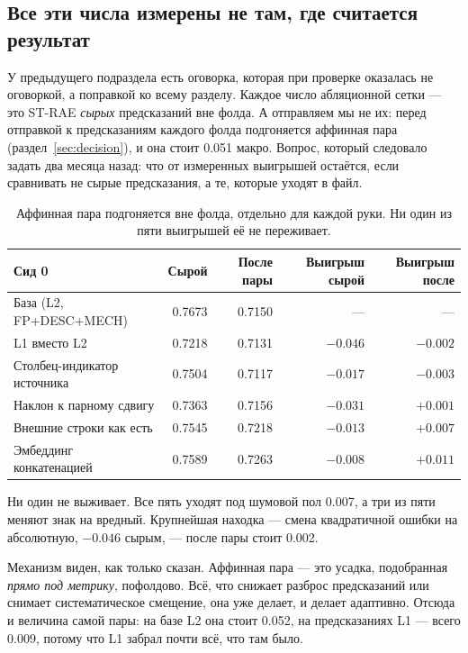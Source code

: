 \subsection{Все эти числа измерены не там, где считается результат}
\label{sec:rawvspost}

У предыдущего подраздела есть оговорка, которая при проверке оказалась не оговоркой, а
поправкой ко всему разделу. Каждое число абляционной сетки --- это ST-RAE \emph{сырых}
предсказаний вне фолда. А отправляем мы не их: перед отправкой к предсказаниям каждого фолда
подгоняется аффинная пара (раздел~\ref{sec:decision}), и она стоит 0.051 макро. Вопрос,
который следовало задать два месяца назад: что от измеренных выигрышей остаётся, если
сравнивать не сырые предсказания, а те, которые уходят в файл.

\begin{table}[htbp]\centering\small
\begin{tabularx}{\textwidth}{@{}Xrrrr@{}}
\toprule
Сид 0 & Сырой & После пары & Выигрыш сырой & \textbf{Выигрыш после} \\
\midrule
База (L2, FP+DESC+MECH)      & 0.7673 & 0.7150 & --- & --- \\
L1 вместо L2                 & 0.7218 & 0.7131 & $-0.046$ & $\mathbf{-0.002}$ \\
Столбец-индикатор источника  & 0.7504 & 0.7117 & $-0.017$ & $\mathbf{-0.003}$ \\
Наклон к парному сдвигу      & 0.7363 & 0.7156 & $-0.031$ & $\mathbf{+0.001}$ \\
Внешние строки как есть      & 0.7545 & 0.7218 & $-0.013$ & $\mathbf{+0.007}$ \\
Эмбеддинг конкатенацией      & 0.7589 & 0.7263 & $-0.008$ & $\mathbf{+0.011}$ \\
\bottomrule
\end{tabularx}
\caption{Аффинная пара подгоняется вне фолда, отдельно для каждой руки. Ни один из пяти
выигрышей её не переживает.}
\label{tab:rawpost}
\end{table}

Ни один не выживает. Все пять уходят под шумовой пол 0.007, а три из пяти меняют знак на
вредный. Крупнейшая находка --- смена квадратичной ошибки на абсолютную, $-0.046$ сырым, ---
после пары стоит 0.002.

Механизм виден, как только сказан. Аффинная пара --- это усадка, подобранная \emph{прямо под
метрику}, пофолдово. Всё, что снижает разброс предсказаний или снимает систематическое
смещение, она уже делает, и делает адаптивно. Отсюда и величина самой пары: на базе L2 она
стоит 0.052, на предсказаниях L1 --- всего 0.009, потому что L1 забрал почти всё, что там
было.

